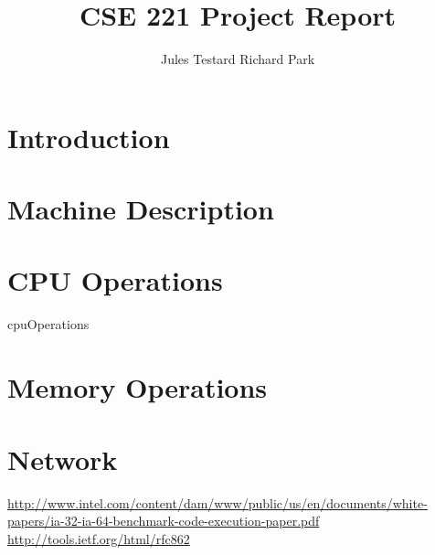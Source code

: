 \documentclass[11pt,twocolumn]{article}
\begin{document}
\title{CSE 221 Project Report}
\author{Jules Testard \quad Richard Park}
\maketitle

\section{Introduction}



\section{Machine Description}



\section{CPU Operations}

 {cpuOperations}

\section{Memory Operations}



\section{Network}



\begin{thebibliography}{9}
    \url{http://www.intel.com/content/dam/www/public/us/en/documents/white-papers/ia-32-ia-64-benchmark-code-execution-paper.pdf}
    \url{http://tools.ietf.org/html/rfc862}
\end{thebibliography}
\end{document}
